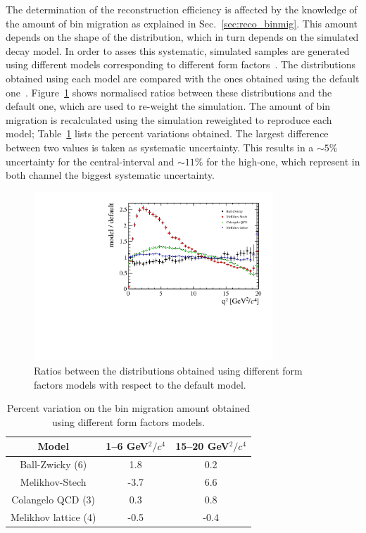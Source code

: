 The determination of the reconstruction efficiency is affected by the knowledge of the
amount of bin migration as explained in Sec.~\ref{sec:reco_binmig}. This amount depends
on the shape of the \qsq distribution, which in turn depends on the simulated \BdToKstee decay model.
In order to asses this systematic, simulated samples are generated using different
models corresponding to different form factors~\cite{Ball:2004ye,Melikhov:2000yu}.
The \qsq distributions obtained using each model are compared with the ones obtained using
the default one~\cite{Ali:1999mm}.
Figure~\ref{fig:q2ratios} shows normalised ratios between these \qsq distributions and the default one, 
which are used to re-weight the simulation. The amount of bin migration is recalculated
using the simulation reweighted to reproduce each model; Table~\ref{tab:sys_binmig} lists the
percent variations obtained. The largest difference between two values is taken as systematic uncertainty.
This results in a $\sim5\%$ uncertainty for the central-\qsq interval and $\sim11\%$ for the high-\qsq one,
which represent in both channel the biggest systematic uncertainty.
%
\begin{figure}[h!]
\centering \includegraphics[width=0.8\textwidth]{RKst/figs/models_ratios.pdf}
\caption{Ratios between the \qsq distributions obtained using different form
factors models with respect to the default model. }
\label{fig:q2ratios}
\end{figure}
%
\begin{table}[h!]
\centering
\caption{Percent variation on the bin migration amount obtained using different form factors models.}
\begin{tabular}{|c|c|c|}
\hline
Model                   & 1--6 GeV$^2/c^4$  &  15--20 GeV$^2/c^4$ \\ \hline
Ball-Zwicky (6)         & 1.8          & 0.2    \\
Melikhov-Stech          & -3.7          & 6.6    \\
Colangelo QCD (3)   & 0.3           & 0.8    \\
Melikhov lattice  (4)   & -0.5          & -0.4    \\
\hline 
\end{tabular}
\label{tab:sys_binmig}
\end{table}




